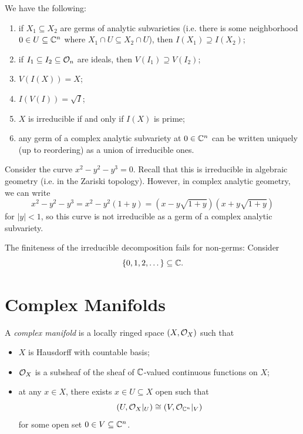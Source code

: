 \begin{prop}
  We have the following:
  \begin{enumerate}
    \item if $X_1 \subseteq X_2$ are
      germs of analytic subvarieties
      (i.e. there is some neighborhood
      $0 \in U \subseteq \mathbb{C}^n$ where
      $X_1 \cap U \subseteq X_2 \cap U$), then
      $I(X_1) \supseteq I(X_2)$;
      \pagebreak
    \item if $I_1 \subseteq I_2 \subseteq \mathcal{O}_n$
      are ideals, then
      $V(I_1) \supseteq V(I_2)$;
    \item $V(I(X)) = X$;
    \item $I(V(I)) = \sqrt{I}$;
    \item $X$ is irreducible if and only if
      $I(X)$ is prime;
    \item any germ of a complex analytic
      subvariety at $0 \in \mathbb{C}^n$
      can be written uniquely (up to
      reordering) as a union of
      irreducible ones.
  \end{enumerate}
\end{prop}

\begin{remark}
  Consider the curve
  $x^2 - y^2 - y^3 = 0$. Recall that
  this is irreducible
  in algebraic geometry (i.e. in the
  Zariski topology). However, in complex
  analytic geometry, we can write
  \[
    x^2 - y^2 - y^3
    = x^2 - y^2(1 + y)
    = (x - y\sqrt{1 + y})(x + y\sqrt{1 + y})
  \]
  for $|y| < 1$, so this curve is
  not irreducible as a germ of a
  complex analytic subvariety.
\end{remark}

\begin{remark}
  The finiteness of the irreducible
  decomposition fails for non-germs:
  Consider
  \[
    \{0, 1, 2, \dots\} \subseteq \mathbb{C}.
  \]
\end{remark}

\section{Complex Manifolds}

\begin{definition}
  A \emph{complex manifold} is a
  locally ringed space $(X, \mathcal{O}_X)$ such that
  \begin{itemize}
    \item $X$ is Hausdorff with countable
      basis;
    \item $\mathcal{O}_X$ is a subsheaf of the
      sheaf of $\mathbb{C}$-valued continuous
      functions on $X$;
    \item at any $x \in X$, there exists
      $x \in U \subseteq X$ open such that
      \[
        (U, \mathcal{O}_X|_U) \cong (V, \mathcal{O}_{\mathbb{C}^n}|_V)
      \]
      for some open set $0 \in V \subseteq \mathbb{C}^n$.
  \end{itemize}
\end{definition}

